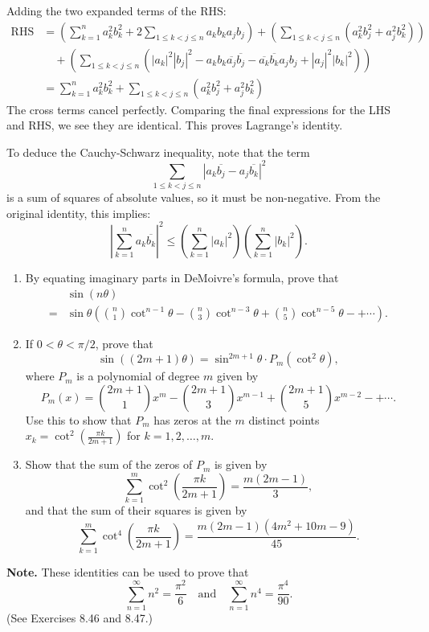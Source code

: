 Adding the two expanded terms of the RHS:
\begin{align*}
\text{RHS} &= \left( \sum_{k=1}^n a_k^2 b_k^2 + 2 \sum_{1 \leq k < j \leq n} a_k b_k a_j b_j \right) + \left( \sum_{1 \leq k < j \leq n} (a_k^2 b_j^2 + a_j^2 b_k^2) \right) \\
&\quad + \left( \sum_{1 \leq k < j \leq n} (|a_k|^2 |b_j|^2 - a_k b_k \overline{a_j} \overline{b_j} - \overline{a_k} \overline{b_k} a_j b_j + |a_j|^2 |b_k|^2) \right) \\
&= \sum_{k=1}^n a_k^2 b_k^2 + \sum_{1 \leq k < j \leq n} (a_k^2 b_j^2 + a_j^2 b_k^2)
\end{align*}
The cross terms cancel perfectly. Comparing the final expressions for the LHS and RHS, we see they are identical. This proves Lagrange's identity.

To deduce the Cauchy-Schwarz inequality, note that the term $$\sum_{1 \leq k < j \leq n} |a_k \overline{b_j} - a_j \overline{b_k}|^2$$ is a sum of squares of absolute values, so it must be non-negative. From the original identity, this implies:
\[ \left| \sum_{k=1}^n a_k \overline{b_k} \right|^2 \leq \left( \sum_{k=1}^n |a_k|^2 \right) \left( \sum_{k=1}^n |b_k|^2 \right). \]

\begin{problembox}
\begin{enumerate}[label=\textbf{(\alph*)}]
\item By equating imaginary parts in DeMoivre's formula, prove that
\begin{align*}
&\sin(n\theta) \\
=& \sin \theta \left( \binom{n}{1} \cot^{n-1} \theta - \binom{n}{3} \cot^{n-3} \theta + \binom{n}{5} \cot^{n-5} \theta - + \cdots \right).
\end{align*}
\item If \( 0 < \theta < \pi/2 \), prove that
\[
\sin((2m+1)\theta) = \sin^{2m+1} \theta \cdot P_m(\cot^2 \theta),
\]
where \( P_m \) is a polynomial of degree \( m \) given by
\[
P_m(x) = \binom{2m+1}{1} x^m - \binom{2m+1}{3} x^{m-1} + \binom{2m+1}{5} x^{m-2} - +\cdots.
\]
Use this to show that \( P_m \) has zeros at the \( m \) distinct points \( x_k = \cot^2 \left( \frac{\pi k}{2m+1} \right) \) for \( k = 1, 2, \dots, m \).
\item Show that the sum of the zeros of \( P_m \) is given by
\[
\sum_{k=1}^m \cot^2 \left( \frac{\pi k}{2m+1} \right) = \frac{m(2m-1)}{3},
\]
and that the sum of their squares is given by
\[
\sum_{k=1}^m \cot^4 \left( \frac{\pi k}{2m+1} \right) = \frac{m(2m-1)(4m^2 + 10m - 9)}{45}.
\]
\end{enumerate}
\textbf{Note.} These identities can be used to prove that
\[
\sum_{n=1}^\infty n^2 = \frac{\pi^2}{6} \quad \text{and} \quad \sum_{n=1}^\infty n^4 = \frac{\pi^4}{90}.
\]
(See Exercises 8.46 and 8.47.)
\end{problembox}

